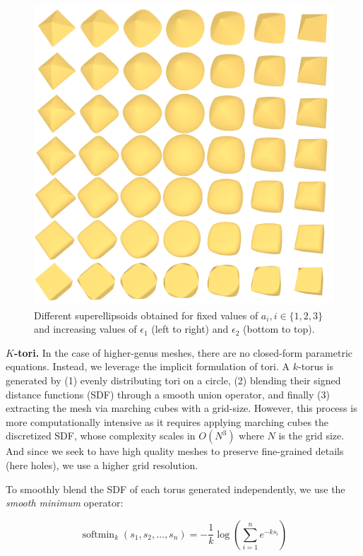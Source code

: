 \begin{figure}[t]
  \centering
  \includegraphics[width=\linewidth]{figs/topogen/ellipsoids_overview.png}
   \caption{Different superellipsoids obtained for fixed values of $a_i, i \in \{1, 2, 3\}$ and increasing values of $\epsilon_1$ (left to right) and $\epsilon_2$ (bottom to top).}
   \label{fig:ellipsoids-overview}
\end{figure}

\textbf{$K$-tori.} In the case of higher-genus meshes, there are no closed-form parametric equations. Instead, we leverage the implicit formulation of tori. A $k$-torus is generated by (1) evenly distributing tori on a circle, (2) blending their signed distance functions (SDF) through a smooth union operator, and finally (3) extracting the mesh via marching cubes with a grid-size. However, this process is more computationally intensive as it requires applying marching cubes the discretized SDF, whose complexity scales in $O(N^3)$ where $N$ is the grid size. And since we seek to have high quality meshes to preserve fine-grained details (here holes), we use a higher grid resolution.

To smoothly blend the SDF of each torus generated independently, we use the \textit{smooth minimum} operator:

\begin{equation}
\operatorname{softmin}_k(s_1, s_2, \dots, s_n) 
= -\frac{1}{k} \log \left( \sum_{i=1}^n e^{-k s_i} \right)
\end{equation}

